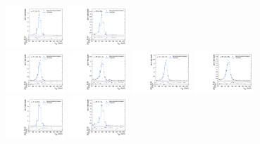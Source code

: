 \begin{figure}[htpb]
  \includegraphics[width=0.2\textwidth]{fig/analysisAppendix/templateVsReco_VBFZprToWW2000_r0_MJ_mu_HP_bb_HDy.pdf}
  \includegraphics[width=0.2\textwidth]{fig/analysisAppendix/templateVsReco_VBFZprToWW2000_r0_MJ_mu_LP_bb_HDy.pdf}\\
  \includegraphics[width=0.2\textwidth]{fig/analysisAppendix/templateVsReco_VBFZprToWW2000_r0_MJ_mu_HP_nobb_LDy.pdf}
  \includegraphics[width=0.2\textwidth]{fig/analysisAppendix/templateVsReco_VBFZprToWW2000_r0_MJ_mu_LP_nobb_LDy.pdf}
  \includegraphics[width=0.2\textwidth]{fig/analysisAppendix/templateVsReco_VBFZprToWW2000_r0_MJ_mu_HP_nobb_HDy.pdf}
  \includegraphics[width=0.2\textwidth]{fig/analysisAppendix/templateVsReco_VBFZprToWW2000_r0_MJ_mu_LP_nobb_HDy.pdf}\\
  \includegraphics[width=0.2\textwidth]{fig/analysisAppendix/templateVsReco_VBFZprToWW2000_r0_MJ_mu_HP_vbf_LDy.pdf}
  \includegraphics[width=0.2\textwidth]{fig/analysisAppendix/templateVsReco_VBFZprToWW2000_r0_MJ_mu_LP_vbf_LDy.pdf}

\end{figure}
